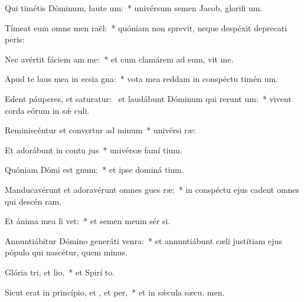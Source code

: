 \item Qui timétis Dóminum, laute um:~* univérsum semen Jacob, glorifi um.
\item Tímeat eum omne men raël:~* quóniam non sprevit, neque despéxit deprecati peris:
\item Nec avértit fáciem am  me:~* et cum clamárem ad eum, vit me.
\item Apud te laus mea in ecsia gna:~* vota mea reddam in conspéctu timén um.
\item Edent páuperes, et saturatur:~\pscross{} et laudábunt Dóminum qui rerunt um:~* vivent corda eórum in sǽ culi.
\item Reminiscéntur et convertur ad minum~* univérsi  ræ:
\item Et adorábunt in contu jus~* univérsæ famí tium.
\item Quóniam Dómi est gnum:~* et ipse dominá tium.
\item Manducavérunt et adoravérunt omnes gues ræ:~* in conspéctu ejus cadent omnes qui descén  ram.
\item Et ánima mea li vet:~* et semen meum sér si.
\item Annuntiábitur Dómino generáti venra:~* et annuntiábunt cæli justítiam ejus pópulo qui nascétur, quem  minus.
\item Glória tri, et lio,~* et Spirí to.
\item Sicut erat in princípio, et , et per,~* et in sǽcula sæcu. men.
